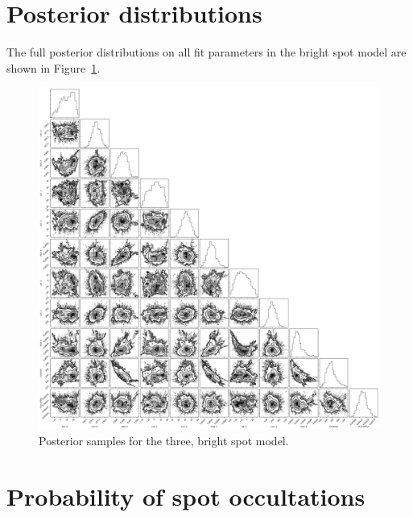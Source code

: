 \begin{subappendices}
\section{Posterior distributions}

The full posterior distributions on all fit parameters in the bright spot model are shown in Figure~\ref{fig:corner}. 

\begin{figure}
\begin{center}
\includegraphics[scale=0.25]{trappist1_bright/corner_bright_spitzer.pdf}
\end{center}
\caption{Posterior samples for the three, bright spot model. \label{fig:corner}}
\end{figure}

\section{Probability of spot occultations}


\end{subappendices}
